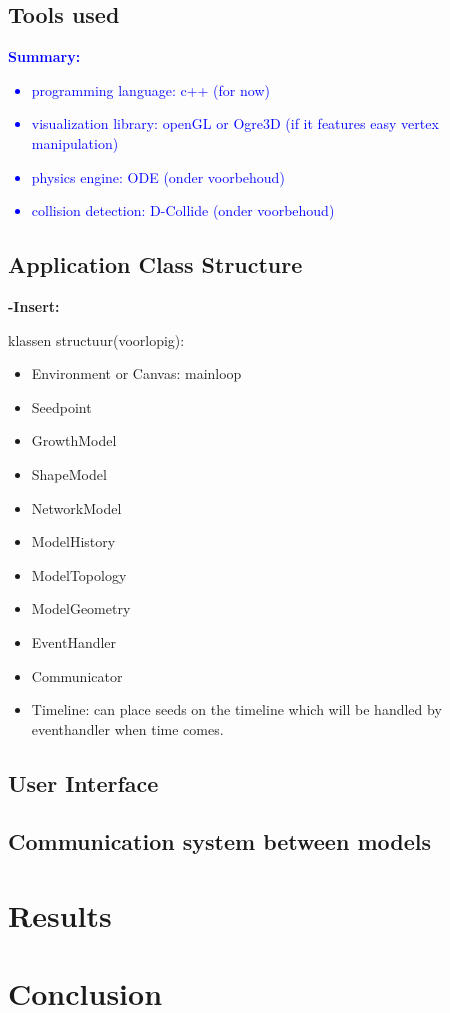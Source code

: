 \documentclass{article}
\newcommand{\inhoud}[1]{\textcolor{blue}{\textbf{\newline Summary: }\it{#1}}}
\newcommand{\voegtoe}[1]{\textcolor{MyDarkGreen}{\textbf{-Insert: }\it{#1}}}
\begin{document}
\subsection{Tools used}
\inhoud{ 
\begin{itemize}
\item programming language: c++ (for now)
\item visualization library: openGL or Ogre3D (if it features easy vertex manipulation) 
\item physics engine: ODE (onder voorbehoud)  
\item collision detection: D-Collide (onder voorbehoud)
\end{itemize}
}

\subsection{Application Class Structure}

\voegtoe{
klassen structuur(voorlopig):
\begin{itemize}
\item Environment or Canvas: mainloop
\item Seedpoint  
\item GrowthModel 
\item ShapeModel
\item NetworkModel
\item ModelHistory
\item ModelTopology
\item ModelGeometry 
\item EventHandler
\item Communicator
\item Timeline: can place seeds on the timeline which will be handled by eventhandler when time comes.  
\end{itemize}
}






\subsection{User Interface}
\subsection{Communication system between models}

\section{Results}

\section{Conclusion}





\newpage 
\end{document}
